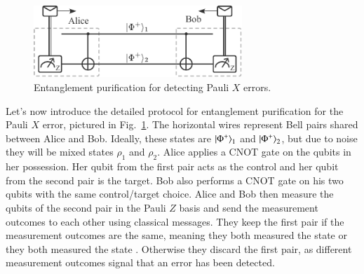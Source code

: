 \begin{figure}[t]
    \centering
    \includegraphics[width=0.7\textwidth]{lesson12/12-4_purification.pdf}
    \caption[Entanglement purification for Pauli X errors]{Entanglement purification for detecting Pauli $X$ errors.}
    \label{fig:12-4_purificaiton}
\end{figure}
Let's now introduce the detailed protocol for entanglement purification for the Pauli $X$ error, pictured in Fig.~\ref{fig:12-4_purificaiton}.
The horizontal wires represent Bell pairs shared between Alice and Bob.
Ideally, these states are $\left| \Phi^+ \right\rangle_1$ and  $\left| \Phi^+ \right\rangle_2$, but due to noise they will be mixed states $\rho_1$ and $\rho_2$.
Alice applies a CNOT gate on the qubits in her possession.
Her qubit from the first pair acts as the control and her qubit from the second pair is the target.
Bob also performs a CNOT gate on his two qubits with the same control/target choice.
Alice and Bob then measure the qubits of the second pair in the Pauli $Z$ basis and send the measurement outcomes to each other using classical messages.
They keep the first pair if the measurement outcomes are the same, meaning they both measured the state  or they both measured the state .
Otherwise they discard the first pair, as different measurement outcomes signal that an error has been detected.

